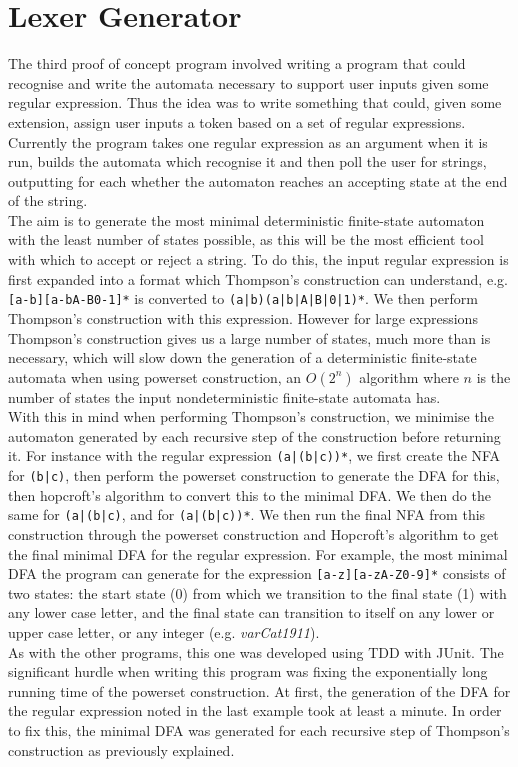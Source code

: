 \documentclass[a4paper, 11pt]{article}
\begin{document}
\section{Lexer Generator}
The third proof of concept program involved writing a program that could recognise and write the automata necessary to support user inputs given some regular expression. Thus the idea was to write something that could, given some extension, assign user inputs a token based on a set of regular expressions. Currently the program takes one regular expression as an argument when it is run, builds the automata which recognise it and then poll the user for strings, outputting for each whether the automaton reaches an accepting state at the end of the string.
\\\newline 
The aim is to generate the most minimal deterministic finite-state automaton with the least number of states possible, as this will be the most efficient tool with which to accept or reject a string. To do this, the input regular expression is first expanded into a format which Thompson's construction can understand, e.g. \texttt{[a-b][a-bA-B0-1]*} is converted to \texttt{(a|b)(a|b|A|B|0|1)*}. We then perform Thompson's construction with this expression. However for large expressions Thompson's construction gives us a large number of states, much more than is necessary, which will slow down the generation of a deterministic finite-state automata when using powerset construction, an $O(2^n)$ algorithm where $n$ is the number of states the input nondeterministic finite-state automata has.
\\\newline
With this in mind when performing Thompson's construction, we minimise the automaton generated by each recursive step of the construction before returning it. For instance with the regular expression \texttt{(a|(b|c))*}, we first create the NFA for \texttt{(b|c)}, then perform the powerset construction to generate the DFA for this, then hopcroft's algorithm to convert this to the minimal DFA. We then do the same for \texttt{(a|(b|c)}, and for \texttt{(a|(b|c))*}. We then run the final NFA from this construction through the powerset construction and Hopcroft's algorithm to get the final minimal DFA for the regular expression. For example, the most minimal DFA the program can generate for the expression \texttt{[a-z][a-zA-Z0-9]*} consists of two states: the start state (0) from which we transition to the final state (1) with any lower case letter, and the final state can transition to itself on any lower or upper case letter, or any integer (e.g. \textit{varCat1911}).
\\\newline
As with the other programs, this one was developed using TDD with JUnit. The significant hurdle when writing this program was fixing the exponentially long running time of the powerset construction. At first, the generation of the DFA for the regular expression noted in the last example took at least a minute. In order to fix this, the minimal DFA was generated for each recursive step of Thompson's construction as previously explained.
\end{document}
